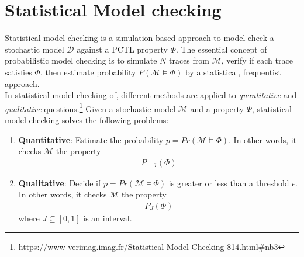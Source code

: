 \section{Statistical Model checking}
Statistical model checking is a simulation-based approach to model check a stochastic model
$\mathcal{D}$ against a PCTL property $\Phi$. The essential concept of probabilistic model
checking is to simulate $N$ traces from $\mathcal{M}$, verify if each trace satisfies $\Phi$, then
estimate probability $P(\mathcal{M}\models\Phi)$ by a statistical, frequentist approach.\\
In statistical model checking of, different methods are applied to \textit{quantitative} and
\textit{qualitative}
questions.\footnote{\url{https://www-verimag.imag.fr/Statistical-Model-Checking-814.html\#nb3}}
Given a stochastic model $\mathcal{M}$ and a property $\Phi$, statistical model checking solves the
following problems:
\begin{enumerate}
      \item \textbf{Quantitative}: Estimate the probability $p = Pr(\mathcal{M}\models\Phi)$. In other
            words, it checks $\mathcal{M}$ the property \begin{align*}
                  P_{=?}(\Phi)
            \end{align*}
      \item \textbf{Qualitative}: Decide if $p = Pr(\mathcal{M}\models\Phi)$ is greater or less than a
            threshold $\epsilon$. In other words, it checks $\mathcal{M}$ the property \begin{align*}
                  P_J(\Phi)
            \end{align*}
            where $J\subseteq[0,1]$ is an interval.
\end{enumerate}

